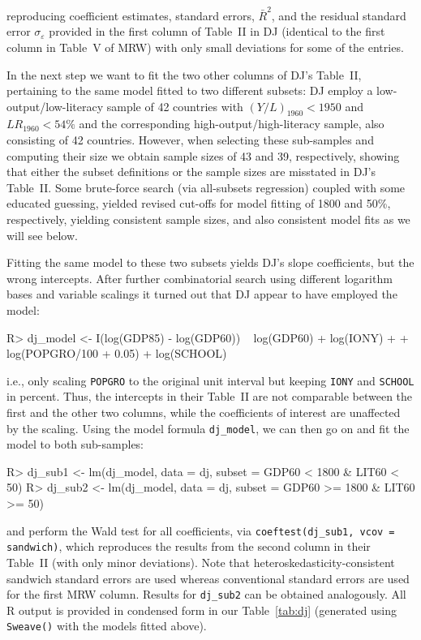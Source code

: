 \documentclass[10pt,a4paper,twoside]{article}
\let\code=\texttt
\let\pkg=\textbf
\let\proglang=\textsf
\newenvironment{Schunk}{}{}
\begin{document}
%
reproducing coefficient estimates, standard errors, $\bar R^2$, and the
residual standard error $\sigma_\varepsilon$ provided in the first column of Table~II 
in DJ (identical to the first column in Table~V of MRW) with only small deviations 
for some of the entries.  



In the next step we want to fit the two other columns of DJ's Table~II, pertaining to
the same model fitted to two different subsets: DJ employ a low-output/low-literacy
sample of 42 countries with $(Y/L)_{1960} < 1950$ and $\mathit{LR}_{1960} < 54\%$ and
the corresponding high-output/high-literacy sample, also consisting of 42 countries. 
However, when selecting these sub-samples and computing their size we obtain
sample sizes of 43 and 39, respectively,
showing that either the subset definitions or the sample sizes are misstated in 
DJ's Table~II.  Some brute-force search (via all-subsets regression) coupled 
with some educated guessing, yielded revised 
cut-offs for model fitting of 1800 and 50\%,
respectively, yielding consistent sample sizes, 
and also consistent model fits as we will see below.

Fitting the same model to these two subsets yields DJ's slope
coefficients, but the wrong intercepts. After further combinatorial search
using different logarithm bases and variable scalings it turned out that DJ 
appear to have employed the model: 
%
\begin{Schunk}
\begin{Sinput}
R> dj_model <- I(log(GDP85) - log(GDP60)) ~ log(GDP60) + log(IONY) +
+    log(POPGRO/100 + 0.05) + log(SCHOOL)
\end{Sinput}
\end{Schunk}
%
i.e., only scaling \code{POPGRO} to the original unit interval but keeping \code{IONY}
and \code{SCHOOL} in percent. Thus, the intercepts in their Table~II are not comparable
between the first and the other two columns, while the coefficients of interest are
unaffected by the scaling. Using the model formula \code{dj\_model}, we can then go on
and fit the model to both sub-samples:
%
\begin{Schunk}
\begin{Sinput}
R> dj_sub1 <- lm(dj_model, data = dj, subset = GDP60 <  1800 & LIT60 <  50)
R> dj_sub2 <- lm(dj_model, data = dj, subset = GDP60 >= 1800 & LIT60 >= 50)
\end{Sinput}
\end{Schunk}
%
%
%
and perform the Wald test for all coefficients, via \code{coeftest(dj\_sub1, vcov = sandwich)},
which reproduces the results from the second column in their Table~II (with only
minor deviations). Note that heteroskedasticity-consistent sandwich
standard errors are used
\citep[provided by package \pkg{sandwich} in \proglang{R}, see][]{repro:Zeileis:2004,repro:Zeileis:2006}
whereas conventional standard errors are used for the first MRW column.
Results for \code{dj\_sub2} can be obtained analogously.
All \proglang{R} output is provided in condensed form
in our Table~\ref{tab:dj} (generated using \code{Sweave()}
with the models fitted above). 
\end{document}
